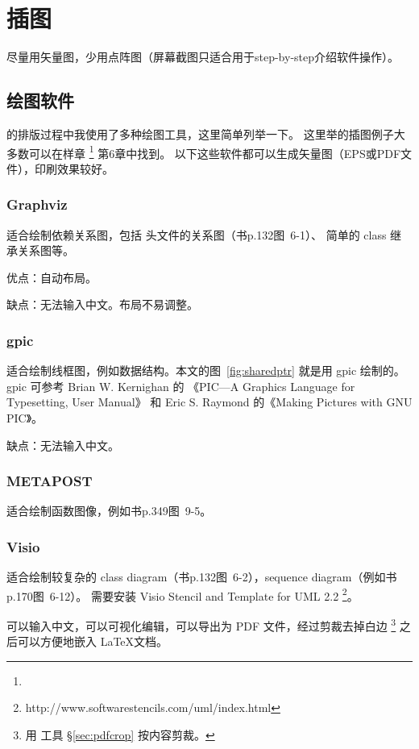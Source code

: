 \chapter{插图}

尽量用矢量图，少用点阵图（屏幕截图只适合用于step-by-step介绍软件操作）。

\section{绘图软件}

\mybooktitle 的排版过程中我使用了多种绘图工具，这里简单列举一下。
这里举的插图例子大多数可以在样章 \footnote{} 第6章中找到。
以下这些软件都可以生成矢量图（EPS或PDF文件），印刷效果较好。

\subsection{Graphviz}
适合绘制依赖关系图，包括  头文件的关系图（书p.132图~6-1）、
简单的 class 继承关系图等。

优点：自动布局。

缺点：无法输入中文。布局不易调整。
\subsection{gpic}

适合绘制线框图，例如数据结构。本文的图~\ref{fig:sharedptr} 就是用 gpic 绘制的。
gpic 可参考 Brian W. Kernighan 的 《PIC---A Graphics Language for Typesetting, User Manual》
和 Eric S. Raymond 的《Making Pictures with GNU PIC》。

缺点：无法输入中文。

\subsection{METAPOST}
适合绘制函数图像，例如书p.349图~9-5。

\subsection{Visio}
适合绘制较复杂的 class diagram（书p.132图~6-2），sequence diagram（例如书p.170图~6-12）。
需要安装 	
Visio Stencil and Template for UML 2.2
\footnote{http://www.softwarestencils.com/uml/index.html}。

可以输入中文，可以可视化编辑，可以导出为 PDF 文件，经过剪裁去掉白边
\footnote{用  工具 \S \ref{sec:pdfcrop} 按内容剪裁。}
之后可以方便地嵌入 \LaTeX 文档。

